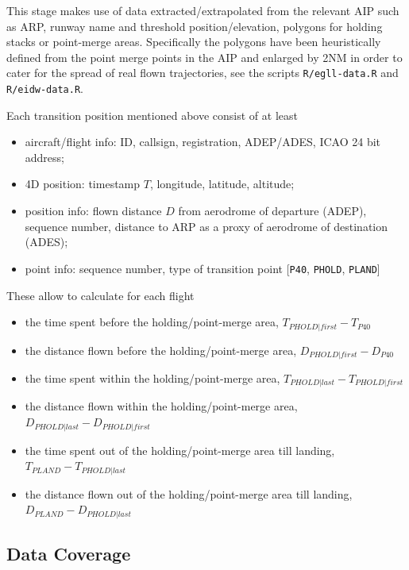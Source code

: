 \documentclass[conference,final,a4paper,]{IEEEtran}
\providecommand{\tightlist}{%
  \setlength{\itemsep}{0pt}\setlength{\parskip}{0pt}}
\begin{document}
This stage makes use of data extracted/extrapolated from the relevant AIP such
as ARP, runway name and threshold position/elevation, polygons for holding
stacks or point-merge areas. Specifically the polygons have been heuristically defined from the
point merge points in the AIP and enlarged by 2NM in order to cater for the spread of real flown
trajectories,
see the scripts \texttt{R/egll-data.R} and \texttt{R/eidw-data.R}.

Each transition position mentioned above consist of at least

\begin{itemize}
\tightlist
\item
  aircraft/flight info: ID, callsign, registration, ADEP/ADES, ICAO 24 bit address;
\item
  4D position: timestamp \(T\), longitude, latitude, altitude;
\item
  position info: flown distance \(D\) from aerodrome of departure (ADEP), sequence number,
  distance to ARP as a proxy of aerodrome of destination (ADES);
\item
  point info: sequence number, type of transition point {[}\texttt{P40}, \texttt{PHOLD}, \texttt{PLAND}{]}
\end{itemize}

These allow to calculate for each flight

\begin{itemize}
\tightlist
\item
  the time spent before the holding/point-merge area, \(T_{PHOLD|first} - T_{P40}\)
\item
  the distance flown before the holding/point-merge area,
  \(D_{PHOLD | first} - D_{P40}\)
\item
  the time spent within the holding/point-merge area, \(T_{PHOLD | last} - T_{PHOLD|first}\)
\item
  the distance flown within the holding/point-merge area,
  \(D_{PHOLD | last} - D_{PHOLD | first}\)
\item
  the time spent out of the holding/point-merge area till landing,
  \(T_{PLAND} - T_{PHOLD | last}\)
\item
  the distance flown out of the holding/point-merge area till landing,
  \(D_{PLAND} - D_{PHOLD | last}\)
\end{itemize}

\hypertarget{data-coverage}{%
\subsection{Data Coverage}\label{data-coverage}}
\end{document}
